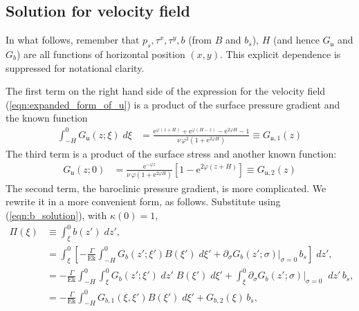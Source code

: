 \documentclass{ametsocV6.2}
\begin{document}
\subsection*{Solution for velocity field}
In what follows, remember that $p_s, \tau^x, \tau^y, b$ (from $B$ and $b_s$), $H$ (and hence $G_{\mathfrak{u}}$ and $G_b$) are all functions of horizontal position $(x,y)$.
This explicit dependence is suppressed for notational clarity.

The first term on the right hand side of the expression for the velocity field (\ref{eqn:expanded_form_of_u}) is a product of the surface pressure gradient and the known function
\begin{align}
 \int_{-H}^0 G_{ \mathfrak{u}}(z;\xi) \; d \xi & = 
 \frac{ \mathrm{e}^{\varphi \left(  z + H \right)} +  \mathrm{e}^{\varphi \left( H - z \right)} - \mathrm{e}^{2 \varphi  H} - 1}{ \nu \, \varphi^{2} \left( 1 + \mathrm{e}^{2 \varphi H} \right)} \equiv G_{\mathfrak{u},1}(z)
\label{eqn:Guv_int_wrt_xi}
\end{align}
The third term is a product of the surface stress and another known function:
\begin{align}
  G_{ \mathfrak{u}}(z;0) & = 
\frac{ \mathrm{e}^{- \varphi z } }{ \nu \,\varphi  \left(1 + \mathrm{e}^{2 \varphi H } \right)}
\left[ 1 - \mathrm{e}^{2 \varphi ( z  + H ) } \right] \equiv G_{\mathfrak{u},2}(z)
\label{eqn:Guv0}
\end{align}
The second term, the baroclinic pressure gradient, is more complicated.
We rewrite it in a more convenient form, as follows.
Substitute using (\ref{eqn:b_solution}), with $\kappa(0) = 1$,
\begin{align}
\Pi(\xi) 
& \equiv \int_{\xi}^{0} b(z') \; dz' , \nonumber \\
& =
\int_{\xi}^{0} \left[ - \frac{\Gamma}{\mathrm{Ek}}  \int_{-H}^{0} G_b(z'; \xi') B(\xi') \; d \xi'  + \partial_\sigma G_b(z';\sigma) |_{\sigma = 0} \, b_s  \right] \; dz' ,  \nonumber \\
& = - \frac{\Gamma}{\mathrm{Ek}} \int_{-H}^{0} \int_{\xi}^{0} G_b(z'; \xi') \; d z'\; B(\xi') \; d \xi'  + \int_{\xi}^{0} \partial_\sigma G_b(z';\sigma) |_{\sigma = 0} \;  \; dz'  \, b_s , \label{eqn:Pi_expanded} \\
& = - \frac{\Gamma}{\mathrm{Ek}} \int_{-H}^{0} G_{b,1}(\xi,\xi') B(\xi') \; d \xi'  + G_{b,2} (\xi)  \, b_s ,
\label{eqn:Pi_def}
\end{align}
\end{document}
